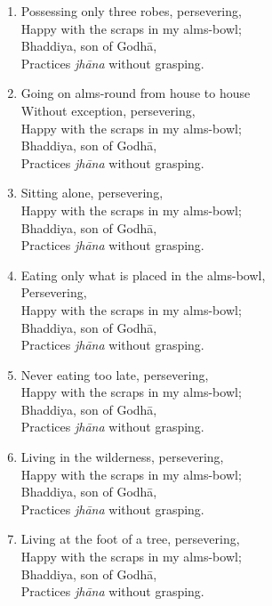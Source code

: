 \documentclass[10pt, openany]{book}
\begin{document}
\begin{enumerate}
\item Possessing only three robes, persevering,\\
Happy with the scraps in my alms-bowl;\\
Bhaddiya, son of Godhā,\\
Practices \emph{jhāna} without grasping.

\item Going on alms-round from house to house \\
Without exception, persevering,\\
Happy with the scraps in my alms-bowl;\\
Bhaddiya, son of Godhā,\\
Practices \emph{jhāna} without grasping.

\item Sitting alone, persevering,\\
Happy with the scraps in my alms-bowl;\\
Bhaddiya, son of Godhā,\\
Practices \emph{jhāna} without grasping.

\item Eating only what is placed in the alms-bowl, \\
Persevering,\\
Happy with the scraps in my alms-bowl;\\
Bhaddiya, son of Godhā,\\
Practices \emph{jhāna} without grasping.

\item Never eating too late, persevering,\\
Happy with the scraps in my alms-bowl;\\
Bhaddiya, son of Godhā,\\
Practices \emph{jhāna} without grasping.

\item Living in the wilderness, persevering,\\
Happy with the scraps in my alms-bowl;\\
Bhaddiya, son of Godhā,\\
Practices \emph{jhāna} without grasping.

\item Living at the foot of a tree, persevering,\\
Happy with the scraps in my alms-bowl;\\
Bhaddiya, son of Godhā,\\
Practices \emph{jhāna} without grasping.


\end{enumerate}
\end{document}
